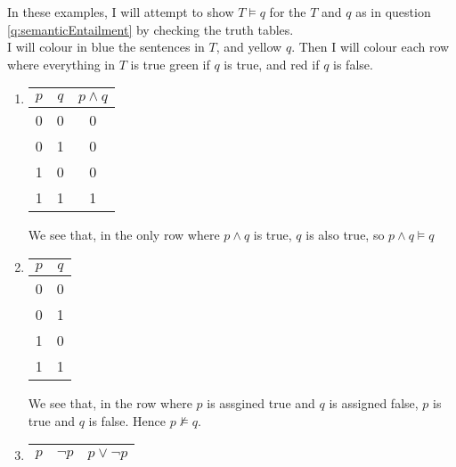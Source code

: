 \documentclass[11pt]{article}
\begin{document}
\begin{answer} In these examples, I will attempt to show $T \vDash q$ for the $T$ and $q$ as in question \ref{q:semanticEntailment} by checking the truth tables. 
    \\I will colour in blue the sentences in $T$, and yellow $q$. Then I will colour each row where everything in $T$ is true green if $q$ is true, and red if $q$ is false.
    \begin{enumerate}
        \item 
        \begin{tabular}{|c|c|c|}
            \hline
            $p$ & \cellcolor{yellow!40}$q$ & \cellcolor{blue!40}$p \land q$\\
            \hline \hline
            0 & 0 & 0 \\
            0 & 1 & 0 \\
            1 & 0 & 0 \\
            \rowcolor{green!40} 1 & 1 & 1 \\
            \hline
        \end{tabular} 
        \quad 
        \begin{minipage}{0.5\textwidth}
            We see that, in the only row where $p \land q$ is true, $q$ is also true, so $p \land q \vDash q$
        \end{minipage}
        \item
        \begin{tabular}{|c|c|}
            \hline
            \cellcolor{blue!40}$p$ & \cellcolor{yellow!40}$q$ \\
            \hline \hline
            0 & 0 \\
            0 & 1 \\
            \rowcolor{red!40}1 & 0 \\
            \rowcolor{green!40}1 &  1 \\
            \hline
        \end{tabular} \quad
        \begin{minipage}{0.5\textwidth}
            We see that, in the row where $p$ is assgined true and $q$ is assigned false, $p$ is true and $q$ is false. Hence $p \not\vDash q$.
        \end{minipage}
        \item
        \begin{tabular}{|c|c|c|}
            \hline
            $p$ & $\neg p$ & \cellcolor{yellow!40}$p \lor \neg p$ \\
            \hline \hline

\end{tabular}
\end{enumerate}
\end{answer}
\end{document}
